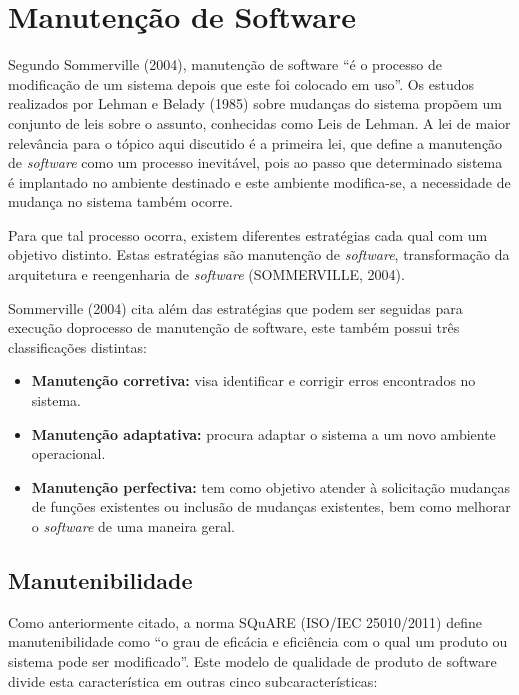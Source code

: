 \chapter[Manutenção de Software]{Manutenção de Software}
Segundo Sommerville (2004), manutenção de software “é o processo de modificação de um sistema depois que este foi colocado em uso”. Os estudos realizados por Lehman e Belady (1985) sobre mudanças do sistema propõem um conjunto de leis sobre o assunto, conhecidas como Leis de Lehman. A lei de maior relevância para o tópico aqui discutido é a primeira lei, que define a manutenção de \textit{software} como um processo inevitável, pois ao passo que determinado sistema é implantado no ambiente destinado e este ambiente modifica-se, a necessidade de mudança no sistema também ocorre.

Para que tal processo ocorra, existem diferentes estratégias cada qual com um objetivo distinto. Estas estratégias são manutenção de \textit{software}, transformação da arquitetura e reengenharia de \textit{software} (SOMMERVILLE, 2004).

Sommerville (2004) cita além das estratégias que podem ser seguidas para execução doprocesso de manutenção de software, este também possui três classificações distintas:
\begin{itemize}
	\item \textbf{Manutenção corretiva:} visa identificar e corrigir erros encontrados no sistema.
	\item \textbf{Manutenção adaptativa:} procura adaptar o sistema a um novo ambiente operacional.
	\item \textbf{Manutenção perfectiva:} tem como objetivo atender à solicitação mudanças de funções existentes ou inclusão de mudanças existentes, bem como melhorar o \textit{software} de uma maneira geral.

\end{itemize}

\section{Manutenibilidade}
Como anteriormente citado, a norma SQuARE (ISO/IEC 25010/2011) define manutenibilidade como  “o grau de eficácia e eficiência com o qual um produto ou sistema pode ser modificado”. Este modelo de qualidade de produto de software divide esta característica em outras cinco subcaracterísticas:

